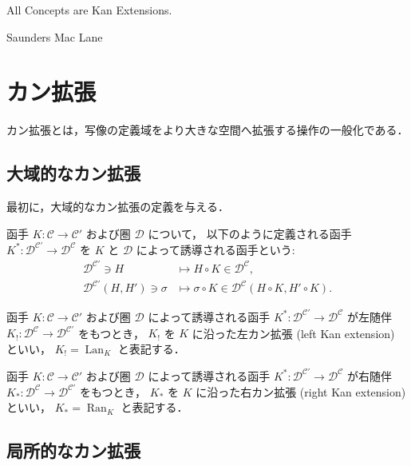 \documentclass[titlepage]{ltjsreport}
\newcommand{\cat}[1]{\mathscr{#1}}
\newcommand{\objs}[1]{#1}
\newcommand{\mrp}[3]{{#1}:{#2}\to{#3}}
\newcommand{\mrps}[3]{#1(#2,#3)}
\DeclareMathOperator{\lan}{Lan}
\DeclareMathOperator{\ran}{Ran}
\begin{document}
\epigraph{All Concepts are Kan Extensions.}{Saunders Mac Lane}

\section{カン拡張}

カン拡張とは，写像の定義域をより大きな空間へ拡張する操作の一般化である．

\subsection{大域的なカン拡張}

最初に，大域的なカン拡張の定義を与える．

\begin{definition}[函手の誘導]
  \def\C{\cat{C}}%
  \def\A{\cat{C'}}%
  \def\D{\cat{D}}%
  \def\K{K}%
  \def\h{H}%
  函手 $\mrp{\K}{\C}{\A}$ および圏 $\D$ について，
  以下のように定義される函手 $\mrp{\K^*}{\D^\A}{\D^\C}$ を
  $\K$ と $\D$ によって誘導される函手という:
  \begin{align}
    \objs{\D^\A}\ni\h
     & \mapsto\h\circ\K\in\objs{\D^\C},                            \\
    \mrps{\D^\A}{\h}{\h'}\ni\sigma
     & \mapsto\sigma\circ\K\in\mrps{\D^\C}{\h\circ\K}{\h'\circ\K}.
  \end{align}
\end{definition}
\begin{definition}
  \def\C{\cat{C}}%
  \def\A{\cat{C'}}%
  \def\D{\cat{D}}%
  \def\K{K}%
  \def\L{\K_!}%
  函手 $\mrp{\K}{\C}{\A}$ および圏 $\D$ によって誘導される函手
  $\mrp{\K^*}{\D^\A}{\D^\C}$ が左随伴 $\mrp{\L}{\D^\C}{\D^\A}$ をもつとき，
  $\L$ を $\K$ に沿った左カン拡張 (left Kan extension) といい，
  $\L=\lan_{\K}$ と表記する．
\end{definition}
\begin{definition}
  \def\C{\cat{C}}%
  \def\A{\cat{C'}}%
  \def\D{\cat{D}}%
  \def\K{K}%
  \def\R{\K_*}%
  函手 $\mrp{\K}{\C}{\A}$ および圏 $\D$ によって誘導される函手
  $\mrp{\K^*}{\D^\A}{\D^\C}$ が右随伴 $\mrp{\R}{\D^\C}{\D^\A}$ をもつとき，
  $\R$ を $\K$ に沿った右カン拡張 (right Kan extension) といい，
  $\R=\ran_{\K}$ と表記する．
\end{definition}

\subsection{局所的なカン拡張}
\end{document}

